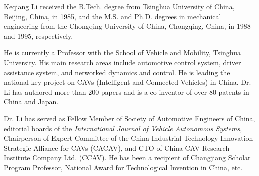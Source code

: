 \documentclass[journal]{IEEEtranTIE}
\begin{document}
\begin{IEEEbiography}{Keqiang Li} received the B.Tech. degree from Tsinghua University of China, Beijing, China, in 1985, and the M.S. and Ph.D. degrees in mechanical engineering from the Chongqing University of China, Chongqing, China, in 1988 and 1995, respectively.
	
	He is currently a Professor with the School of Vehicle and Mobility, Tsinghua University. His main research areas include automotive control system, driver assistance system, and networked dynamics and control. He is leading the national key project on CAVs (Intelligent and Connected Vehicles) in China. Dr. Li has authored more than 200 papers and is a co-inventor of over 80 patents in China and Japan.
	
	Dr. Li has served as Fellow Member of Society of Automotive Engineers of China, editorial boards of the \emph{International Journal of Vehicle Autonomous Systems}, Chairperson of Expert Committee of the China Industrial Technology Innovation Strategic Alliance for CAVs (CACAV), and CTO of China CAV Research Institute Company Ltd. (CCAV). He has been a recipient of Changjiang Scholar Program Professor, National Award for Technological Invention in China, etc.
\end{IEEEbiography}

\balance
\end{document}
